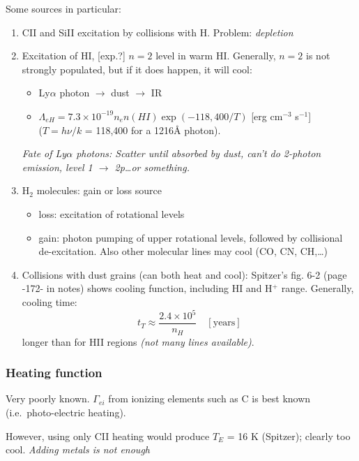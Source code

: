 \documentclass[12pt]{article}
\newcommand{\mar}[1]{\hspace{0pt}\marginpar{-\textcolor{black}{#1}-}}
\newcommand{\mynotes}[1]{{\fontfamily{cmss}\selectfont \textit{#1}}}
\begin{document}
\mar{161}Some sources in particular:
\begin{enumerate}
    \item CII and SiII excitation by collisions with H. Problem: \emph{depletion}
    \item Excitation of HI, [exp.?] $n=2$ level in warm HI.
        Generally, $n=2$ is not strongly populated, but if it does happen,
        it will cool:
        \begin{itemize}[itemsep=0ex]
            \item Ly$\alpha$ photon $\rightarrow$ dust $\rightarrow$ IR
            \item $\Lambda_{eH} = 7.3\times10^{-19} n_{e}n(HI)
                \exp(-118,400/T) $ [erg cm$^{-3}$ s$^{-1}$]\\
                ($T = h\nu/k$ = 118,400 for a 1216\AA{} photon).
        \end{itemize}
        \mynotes{Fate of Ly$\alpha$ photons: Scatter until absorbed by dust,
        can't do 2-photon emission, level 1 $\rightarrow$ 2p\ldots or something.}
    \item H$_{2}$ molecules: gain or loss source
        \begin{itemize}
            \item loss: excitation of rotational levels
            \item gain: photon pumping of upper rotational levels, followed by
                collisional de-excitation.
                Also other molecular lines may cool (CO, CN, CH,\ldots)
        \end{itemize}
    \item Collisions with dust grains (can both heat and cool):
        Spitzer's fig. 6-2 (page -172- in notes) shows cooling function,
        including HI and H$^{+}$ range.
        Generally, cooling time:
        \[
            t_{T} \approx \frac{2.4\times10^{5}}{n_{H}} \quad [\mathrm{years}]
            \]
        longer than for HII regions \mynotes{(not many lines available)}.
\end{enumerate}

\subsubsection{Heating function}
Very poorly known. $\Gamma_{ei}$ from ionizing elements such as C is best
known (i.e.\ photo-electric heating).

\mar{162}However, using only CII heating would produce $T_{E}$ = 16 K
(Spitzer); clearly too cool. \mynotes{Adding metals is not enough}
\end{document}
